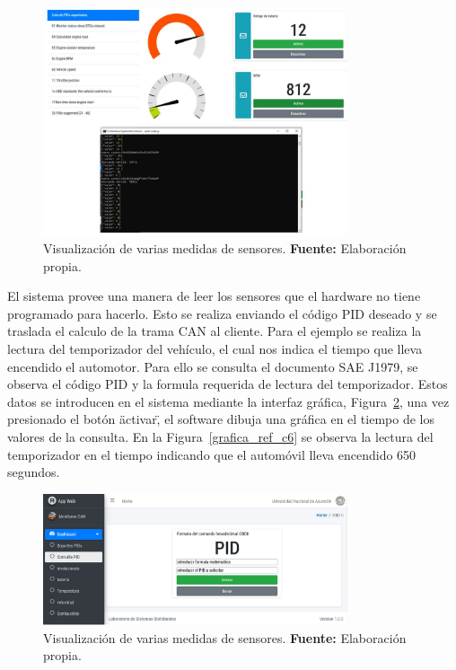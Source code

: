 \begin{figure}[H]
	\centering
	\includegraphics[width=0.8\textwidth]{./Cap6imagen/dash_fig_c6.jpg}
	\caption [Visualización de varias medidas de sensores.]{Visualización de varias medidas de sensores.  \textbf{ Fuente:} %
		Elaboración propia.}
	\label{dash_ref_c6} %
\end{figure}


El sistema provee una manera de leer los sensores que el hardware no tiene programado para hacerlo. 
Esto se realiza enviando el código PID deseado y  se traslada el calculo de la trama CAN al cliente. 
Para el ejemplo se realiza la lectura del temporizador del vehículo, el cual nos indica el tiempo que lleva encendido el automotor. 
Para ello se consulta el documento SAE J1979, se observa el código PID y la formula requerida de lectura del temporizador. 
Estos datos se introducen en el sistema mediante la interfaz gráfica, Figura~\ref{consulta_ref_c6}, una vez presionado el botón \"activar\", el software dibuja  una gráfica en el tiempo de los valores de la consulta. 
En la Figura~\ref{grafica_ref_c6} se observa la lectura del temporizador en el tiempo indicando que el automóvil lleva encendido 650 segundos. 

\begin{figure}[H]
	\centering
	\includegraphics[width=0.8\textwidth]{./Cap6imagen/consulta_fig_c6.png}
	\caption [Visualización de varias medidas de sensores.]{Visualización de varias medidas de sensores.  \textbf{ Fuente:} %
		Elaboración propia.}
	\label{consulta_ref_c6} %
\end{figure}


